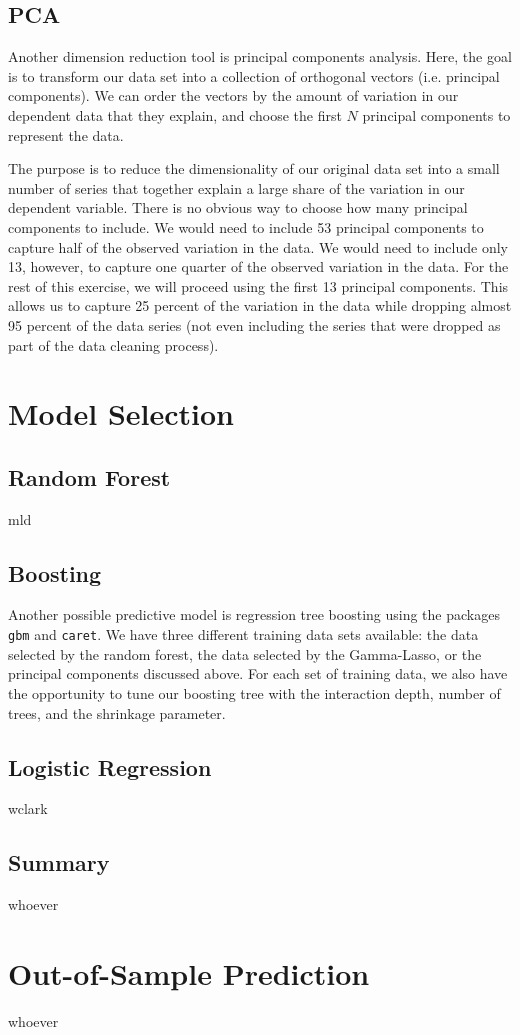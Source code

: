 \documentclass[11pt, fleqn]{article}
\begin{document}
\subsection{PCA}

Another dimension reduction tool is principal components analysis. Here, the goal is to transform our data set into a collection of orthogonal vectors (i.e. principal components). We can order the vectors by the amount of variation in our dependent data that they explain, and choose the first $N$ principal components to represent the data.

The purpose is to reduce the dimensionality of our original data set into a small number of series that together explain a large share of the variation in our dependent variable. There is no obvious way to choose how many principal components to include. We would need to include 53 principal components to capture half of the observed variation in the data. We would need to include only 13, however, to capture one quarter of the observed variation in the data. For the rest of this exercise, we will proceed using the first 13 principal components. This allows us to capture 25 percent of the variation in the data while dropping almost 95 percent of the data series (not even including the series that were dropped as part of the data cleaning process). 

\section{Model Selection}
\subsection{Random Forest}
mld

\subsection{Boosting}
Another possible predictive model is regression tree boosting using the packages \texttt{gbm} and \texttt{caret}. We have three different training data sets available: the data selected by the random forest, the data selected by the Gamma-Lasso, or the principal components discussed above. For each set of training data, we also have the opportunity to tune our boosting tree with the interaction depth, number of trees, and the shrinkage parameter.

\subsection{Logistic Regression}
wclark
\subsection{Summary}
whoever
\section{Out-of-Sample Prediction}
whoever
\end{document}
